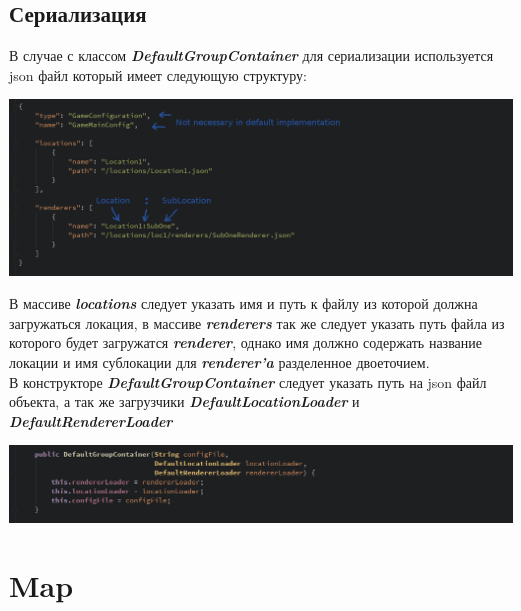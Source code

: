 \documentclass[11pt]{report}
\begin{document}
\subsection{Сериализация}
В случае с классом \textit{\textbf{DefaultGroupContainer}} для сериализации используется json файл который имеет следующую структуру: 
\begin{center}
	\includegraphics[width=1.2\linewidth]{img/13.png} 
  	\label{img:130} 
\end{center} 
В массиве \textit{\textbf{locations}} следует указать имя и путь к файлу из которой должна загружаться локация, в массиве \textit{\textbf{renderers}} так же следует указать путь файла из которого будет загружатся \textit{\textbf{renderer}}, однако имя должно содержать 
название локации и имя сублокации для \textit{\textbf{renderer'a}} разделенное двоеточием.\\ В конструкторе \textit{\textbf{DefaultGroupContainer}} следует указать путь на json файл объекта, а так же загрузчики \textit{\textbf{DefaultLocationLoader}} и \textit{\textbf{DefaultRendererLoader}}
\begin{center}
	\includegraphics[width=1.2\linewidth]{img/16.png} 
  	\label{img:160} 
\end{center} 

\newpage
\section{Map}
\end{document}
